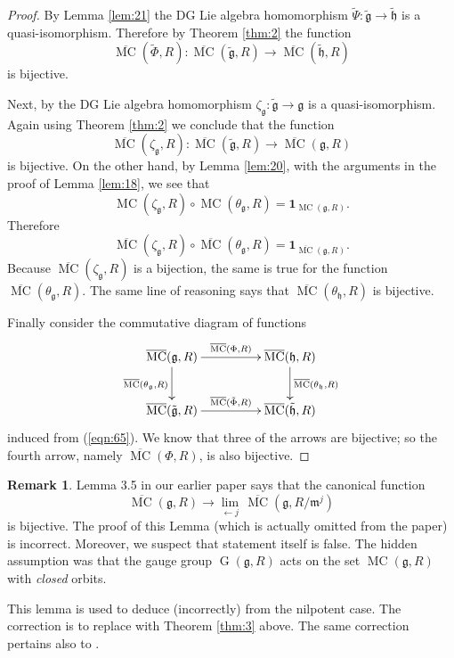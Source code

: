 \documentclass[a4paper,10pt]{amsart}
\theoremstyle{definition}
\newtheorem{rem}[equation]{Remark}
\numberwithin{equation}{section}
\newcommand{\opn}{\operatorname}
\newcommand{\ol}{\overline}
\newcommand{\mfrak}[1]{\mathfrak{#1}}
\newcommand{\bsym}[1]{\boldsymbol{#1}}
\newcommand{\til}[1]{\tilde{#1}}
\newcommand{\g}{\mfrak{g}}
\newcommand{\m}{\mfrak{m}}
\newcommand{\h}{\mfrak{h}}
\renewcommand{\th}{\theta}
\begin{document}
\begin{proof}
By Lemma \ref{lem:21} the DG Lie algebra homomorphism 
$\til{\Psi} : \til{\g} \to \til{\h}$ is a quasi-isomorphism.
Therefore by Theorem \ref{thm:2} the function 
\[  \ol{\opn{MC}}(\til{\Phi}, R) : \ol{\opn{MC}}(\til{\g}, R) \to 
\ol{\opn{MC}}(\til{\h}, R) \]
is bijective.

Next, by \cite[Proposition 4.4.3(1)]{Hi2} the DG Lie algebra homomorphism
$\zeta_{\g} : \til{\g} \to \g$ is a  quasi-isomorphism.
Again using Theorem \ref{thm:2} we conclude that the function 
\[  \ol{\opn{MC}}(\zeta_{\g}, R) : \ol{\opn{MC}}(\til{\g}, R) \to 
\ol{\opn{MC}}(\g, R) \]
is bijective. On the other hand, by Lemma \ref{lem:20}, with the arguments in
the proof of Lemma \ref{lem:18}, we see that 
\[ \opn{MC}(\zeta_{\g}, R) \circ \opn{MC}(\th_{\g}, R) = 
\bsym{1}_{\opn{MC}(\g, R)} . \]
Therefore 
\[ \ol{\opn{MC}}(\zeta_{\g}, R) \circ \ol{\opn{MC}}(\th_{\g}, R) = 
\bsym{1}_{\ol{\opn{MC}}(\g, R)} . \]
Because $\ol{\opn{MC}}(\zeta_{\g}, R)$ is a bijection, the same is true for the
function $\ol{\opn{MC}}(\th_{\g}, R)$. 
The same line of reasoning says that 
$\ol{\opn{MC}}(\th_{\h}, R)$ is bijective. 

Finally consider the commutative diagram of functions
\[ \UseTips \xymatrix @C=11ex @R=6ex {
\ol{\opn{MC}}(\g, R)
\ar[r]^{\ol{\opn{MC}}(\Phi, R)}
\ar[d]_{\ol{\opn{MC}}(\th_{\g}, R)}
&
\ol{\opn{MC}}(\h, R)
\ar[d]^{\ol{\opn{MC}}(\th_{\h}, R)}
\\
\ol{\opn{MC}}(\til{\g}, R)
\ar[r]^{\ol{\opn{MC}}(\til{\Phi}, R)}
&
\ol{\opn{MC}}(\til{\h}, R)
} \]
induced from (\ref{eqn:65}). 
We know that three of the arrows are bijective; so the fourth arrow, namely 
$\ol{\opn{MC}}(\Phi, R)$, is also bijective.
\end{proof}

\begin{rem} \label{rem:1}
Lemma 3.5 in our earlier paper \cite{Ye1} says that the canonical function 
\[ \ol{\opn{MC}}(\g, R) \to \lim_{\leftarrow j} \,
\ol{\opn{MC}}(\g, R / \m^j) \]
is bijective. The proof of this Lemma
(which is actually omitted from the paper) is incorrect. Moreover, we
suspect that statement itself is false. The hidden assumption was that 
the gauge group $\opn{G}(\g, R)$ acts on the set $\opn{MC}(\g, R)$
with {\em closed} orbits. 

This lemma is used to deduce \cite[Corollary 3.10]{Ye1} (incorrectly) 
from the nilpotent case. The correction is to replace 
\cite[Corollary 3.10]{Ye1} with Theorem \ref{thm:3} above.
The same correction pertains also to \cite[formula (12.2)]{Ye4}.
\end{rem}
\end{document}
